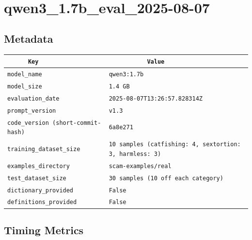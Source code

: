 \documentclass{article}
\begin{document}
\section{qwen3\_1.7b\_eval\_2025-08-07}
\subsection{Metadata}

\begin{center}
\begin{tabular}{l | l} \hline
    \verb|      Key      | & \verb|           Value           | \\ \hline
    \hline
    \verb|model_name    | & \verb|qwen3:1.7b                   | \\ \hline
    \verb|model_size    | & \verb|1.4 GB                       | \\ \hline
    \verb|evaluation_date| & \verb|2025-08-07T13:26:57.828314Z  | \\ \hline
    \verb|prompt_version| & \verb|v1.3                         | \\ \hline
    \verb|code_version (short-commit-hash)| & \verb|6a8e271                      | \\ \hline
    \verb|training_dataset_size| & \verb|10 samples (catfishing: 4, sextortion: 3, harmless: 3)| \\ \hline
    \verb|examples_directory| & \verb|scam-examples/real           | \\ \hline
    \verb|test_dataset_size| & \verb|30 samples (10 off each category)| \\ \hline
    \verb|dictionary_provided| & \verb|False                        | \\ \hline
    \verb|definitions_provided| & \verb|False                        | \\ \hline
\end{tabular}
\end{center}

\subsection{Timing Metrics}
\end{document}
